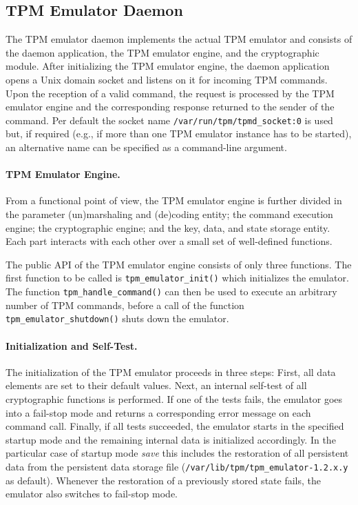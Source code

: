 \documentclass[runningheads]{llncs}
\newcommand{\file}[1]{\small\texttt{#1}\normalsize}
\newcommand{\func}[1]{\small\texttt{#1}\normalsize}
\begin{document}
\subsection{TPM Emulator Daemon}
The TPM emulator daemon implements the actual TPM emulator and consists of
the daemon application, the TPM emulator engine, and the cryptographic module.
After initializing the TPM emulator engine, the daemon application opens a
Unix domain socket and listens on it for incoming TPM commands. Upon the
reception of a valid command, the request is processed by the TPM emulator
engine and the corresponding response returned to the sender of the command.
Per default the socket name \file{/var/run/tpm/tpmd\_socket:0} is used but,
if required (e.g., if more than one TPM emulator instance has to be started),
an alternative name can be specified as a command-line argument.

\paragraph{TPM Emulator Engine.}
From a functional point of view, the TPM emulator engine is further divided
in the parameter (un)marshaling and (de)coding entity; the command execution
engine; the cryptographic engine; and the key, data, and state storage entity.
Each part interacts with each other over a small set of well-defined functions.

The public API of the TPM emulator engine consists of only three functions.
The first function to be called is \func{tpm\_emulator\_init()} which
initializes the emulator. The function \func{tpm\_\-handle\_\-command()} can
then be used to execute an arbitrary number of TPM commands, before a call of
the function \func{tpm\_emulator\_shutdown()} shuts down the emulator.

\paragraph{Initialization and Self-Test.}
The initialization of the TPM emulator proceeds in three steps:
First, all data elements are set to their default values.
Next, an internal self-test of all cryptographic functions
is performed. If one of the tests fails, the emulator goes into a fail-stop
mode and returns a corresponding error message on each command call. Finally,
if all tests succeeded, the emulator starts in the specified startup mode and
the remaining internal data is initialized accordingly. In the particular case
of startup mode \emph{save} this includes the restoration of all persistent
data from the persistent data storage file
(\file{/var/lib/tpm/tpm\_emulator-1.2.x.y} as default).
Whenever the restoration of a previously stored state fails, the emulator
also switches to fail-stop mode.
\end{document}

